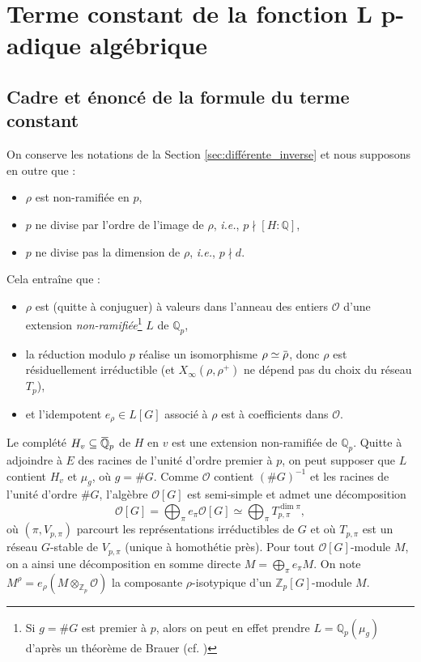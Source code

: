 \documentclass[12pt]{amsart}
\newcommand\bQ{\mathbb{Q}}
\newcommand\Zp{{\mathbb{Z}_{p}}}
\newcommand\Qp{\mathbb{Q}_{p}}
\newcommand\cO{\mathcal{O}}
\newcommand{\ob}[1]{\mkern 1.5mu\overline{\mkern-1.5mu#1\mkern-1.5mu}\mkern 1.5mu}
\theoremstyle{defstyle}
\theoremstyle{thmstyle}
\begin{document}
	\section{Terme constant de la fonction L p-adique algébrique}
\subsection{Cadre et énoncé de la formule du terme constant}\label{subsec:hyp_f_alpha}

On conserve les notations de la Section \ref{sec:différente_inverse} et nous supposons en outre que : 
\begin{itemize}
	\item[\textbf{(nr)}] $\rho$ est non-ramifiée en $p$,
	\item[\textbf{(deg)}] $p$ ne divise par l'ordre de l'image de $\rho$, \textit{i.e.}, $p\nmid [H:\bQ]$,
	\item[\textbf{(dim)}] $p$ ne divise pas la dimension de $\rho$, \textit{i.e.}, $p\nmid d$.
\end{itemize}
Cela entraîne que :
\begin{itemize}
	\item $\rho$ est (quitte à conjuguer) à valeurs dans l'anneau des entiers $\cO$ d'une extension \textit{non-ramifiée}\footnote{Si $g=\#G$ est premier à $p$, alors on peut en effet prendre $L=\Qp(\mu_g)$ d'après un théorème de Brauer (cf. \cite[§12.3, Théorème 24 \& Corollaire]{serrerepresentations})} $L$ de $\Qp$,
	\item la réduction modulo $p$ réalise un isomorphisme $\rho \simeq \ob{\rho}$, donc $\rho$ est résiduellement irréductible (et $X_\infty(\rho,\rho^+)$ ne dépend pas du choix du réseau $T_p$),
	\item et l'idempotent $e_\rho\in L[G]$ associé à $\rho$ est à coefficients dans $\cO$.
\end{itemize}

Le complété $H_v \subseteq \ob{\bQ}_p$ de $H$ en $v$ est une extension non-ramifiée de $\Qp$. Quitte à adjoindre à $E$ des racines de l'unité d'ordre premier à $p$, on peut supposer que $L$ contient $H_v$ et $\mu_{g}$, où $g=\#G$. Comme $\cO$ contient $\left(\#G\right)^{-1}$ et les racines de l'unité d'ordre $\#G$, l'algèbre $\cO[G]$ est semi-simple et admet une décomposition
$$\cO[G] = \bigoplus_\pi e_\pi \cO[G]\simeq \bigoplus_\pi T_{p,\pi}^{\dim \pi},$$
où $(\pi,V_{p,\pi})$ parcourt les représentations irréductibles de $G$ et où $T_{p,\pi}$ est un réseau $G$-stable de $V_{p,\pi}$ (unique à homothétie près). Pour tout $\cO[G]$-module $M$, on a ainsi une décomposition en somme directe $M = \bigoplus_{\pi} e_{\pi}M$. On note $M^\rho =e_\rho(M\otimes_{\Zp} \cO)$  la composante $\rho$-isotypique d'un $\Zp[G]$-module $M$.
\end{document}

